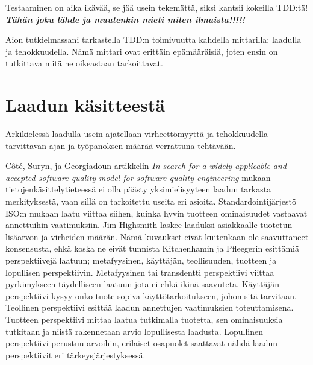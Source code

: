 \documentclass[finnish]{tktltiki2}
\theoremstyle{definition}
\theoremstyle{remark}
\begin{document}
Testaaminen on aika ikävää, se jää usein tekemättä, siksi kantsii kokeilla TDD:tä! \textbf{\textit{Tähän joku lähde ja muutenkin mieti miten ilmaista!!!!!}}

Aion tutkielmassani tarkastella TDD:n toimivuutta kahdella mittarilla: laadulla ja tehokkuudella. Nämä mittari ovat erittäin epämääräisiä, joten ensin on tutkittava mitä ne oikeastaan tarkoittavat.


\section{Laadun käsitteestä}

Arkikielessä laadulla usein ajatellaan virheettömyyttä ja tehokkuudella tarvittavan ajan ja työpanoksen määrää verrattuna tehtävään. 


Côté,  Suryn, ja Georgiadoun artikkelin \emph{In search for a widely applicable and accepted software quality model for software quality engineering}  mukaan tietojenkäsittelytieteessä ei olla päästy yksimielisyyteen laadun tarkasta merkityksestä, vaan sillä on tarkoitettu useita eri asioita. Standardointijärjestö ISO:n mukaan laatu viittaa siihen, kuinka hyvin tuotteen ominaisuudet vastaavat annettuihin vaatimuksiin. Jim Highsmith laskee laaduksi asiakkaalle tuotetun lisäarvon %
 ja virheiden määrän. Nämä kuvaukset eivät kuitenkaan ole saavuttaneet konsensusta, ehkä koska ne eivät tunnista Kitchenhamin ja Pfleegerin esittämiä perspektiivejä laatuun; metafyysinen, käyttäjän, teollisuuden, tuotteen ja lopullisen perspektiivin. Metafyysinen tai transdentti perspektiivi viittaa pyrkimykseen täydelliseen laatuun jota ei ehkä ikinä saavuteta. Käyttäjän perspektiivi kysyy onko tuote sopiva käyttötarkoitukseen, johon sitä tarvitaan. Teollinen perspektiivi esittää laadun annettujen vaatimuksien toteuttamisena. Tuotteen perspektiivi mittaa laatua tutkimalla tuotetta, sen ominaisuuksia tutkitaan ja niistä rakennetaan arvio lopullisesta laadusta. Lopullinen perspektiivi perustuu arvoihin, erilaiset osapuolet saattavat nähdä laadun perspektiivit eri tärkeysjärjestyksessä. \cite{Cote07}


\end{document}
